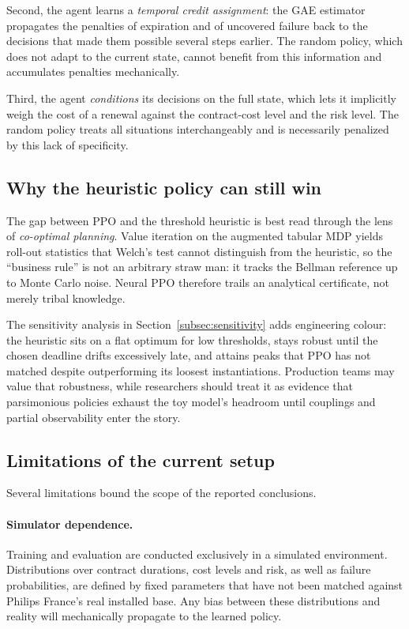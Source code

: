 Second, the agent learns a \emph{temporal credit assignment}: the GAE estimator propagates the penalties of expiration and of uncovered failure back to the decisions that made them possible several steps earlier. The random policy, which does not adapt to the current state, cannot benefit from this information and accumulates penalties mechanically.

Third, the agent \emph{conditions} its decisions on the full state, which lets it implicitly weigh the cost of a renewal against the contract-cost level and the risk level. The random policy treats all situations interchangeably and is necessarily penalized by this lack of specificity.


\subsection{Why the heuristic policy can still win}
\label{subsec:why-heuristic-wins}

The gap between PPO and the threshold heuristic is best read through the lens of \emph{co-optimal planning}. Value iteration on the augmented tabular MDP yields roll-out statistics that Welch's test cannot distinguish from the heuristic, so the ``business rule'' is not an arbitrary straw man: it tracks the Bellman reference up to Monte Carlo noise. Neural PPO therefore trails an analytical certificate, not merely tribal knowledge.

The sensitivity analysis in Section~\ref{subsec:sensitivity} adds engineering colour: the heuristic sits on a flat optimum for low thresholds, stays robust until the chosen deadline drifts excessively late, and attains peaks that PPO has not matched despite outperforming its loosest instantiations. Production teams may value that robustness, while researchers should treat it as evidence that parsimonious policies exhaust the toy model's headroom until couplings and partial observability enter the story.


\subsection{Limitations of the current setup}
\label{subsec:limitations}

Several limitations bound the scope of the reported conclusions.

\paragraph{Simulator dependence.}
Training and evaluation are conducted exclusively in a simulated environment. Distributions over contract durations, cost levels and risk, as well as failure probabilities, are defined by fixed parameters that have not been matched against Philips France's real installed base. Any bias between these distributions and reality will mechanically propagate to the learned policy.

